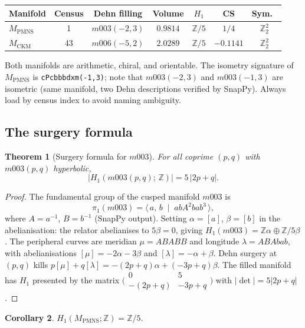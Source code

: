 \documentclass[11pt,a4paper]{article}
\newtheorem{theorem}{Theorem}
\newtheorem{corollary}[theorem]{Corollary}
\theoremstyle{definition}
\theoremstyle{remark}
\newcommand{\ZZ}{\mathbb{Z}}
\newcommand{\Zfive}{\mathbb{Z}/5}
\newcommand{\MPMNS}{M_{\mathrm{PMNS}}}
\newcommand{\MCKM}{M_{\mathrm{CKM}}}
\begin{document}
\begin{center}
\begin{tabular}{lcccccc}
\toprule
Manifold & Census & Dehn filling & Volume & $H_1$
  & CS & Sym.\ \\
\midrule
$\MPMNS$ & 1  & $m003(-2,3)$ & $0.9814$ & $\Zfive$
  & $1/4$ & $\mathbb{Z}_2^2$ \\
$\MCKM$  & 43 & $m006(-5,2)$ & $2.0289$ & $\Zfive$
  & $-0.1141$ & $\mathbb{Z}_2^2$ \\
\bottomrule
\end{tabular}
\end{center}

Both manifolds are arithmetic, chiral, and orientable.
The isometry signature of $\MPMNS$ is \texttt{cPcbbbdxm(-1,3)};
note that $m003(-2,3)$ and $m003(-1,3)$ are isometric
(same manifold, two Dehn descriptions verified by SnapPy).
Always load by census index to avoid naming ambiguity.

\subsection{The surgery formula}
\label{subsec:surgery}

\begin{theorem}[Surgery formula for $m003$]
\label{thm:surgery}
For all coprime $(p,q)$ with $m003(p,q)$ hyperbolic,
\[
  |H_1(m003(p,q);\,\ZZ)| = 5\,|2p+q|.
\]
\end{theorem}

\begin{proof}
The fundamental group of the cusped manifold $m003$ is
\[
  \pi_1(m003) = \langle\, a,\,b \;\mid\; ab A^2 b a b^3 \,\rangle,
\]
where $A=a^{-1}$, $B=b^{-1}$ (SnapPy output).
Setting $\alpha=[a]$, $\beta=[b]$ in the abelianisation:
the relator abelianises to $5\beta=0$, giving
$H_1(m003) = \ZZ\alpha \oplus \ZZ/5\beta$.
The peripheral curves are meridian $\mu = ABABB$ and
longitude $\lambda = ABAbab$, with abelianisations
$[\mu] = -2\alpha-3\beta$ and $[\lambda] = -\alpha+\beta$.
Dehn surgery at $(p,q)$ kills $p[\mu]+q[\lambda]
= -(2p+q)\alpha+(-3p+q)\beta$.
The filled manifold has $H_1$ presented by the matrix
$\bigl(\begin{smallmatrix}0&5\\-(2p+q)&-3p+q\end{smallmatrix}\bigr)$
with $|\det| = 5|2p+q|$.
\end{proof}

\begin{corollary}
\label{cor:h1}
$H_1(\MPMNS;\ZZ) = \ZZ/5$.
\end{corollary}
\end{document}
